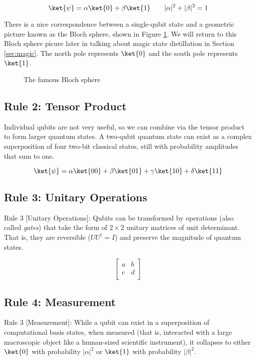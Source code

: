 \begin{equation}
\ket{\psi} = \alpha \ket{0} + \beta \ket{1} \qquad
|\alpha|^2 + |\beta|^2 = 1
\end{equation}

There is a nice correspondence between a single-qubit state and a geometric
picture known as the Bloch sphere, shown in Figure \ref{fig:bloch-sphere}.
We will return to this Bloch sphere picure later in talking about
magic state distillation in Section \ref{sec:magic}.
The north pole represents $\ket{0}$ and the south pole represents $\ket{1}$.

\begin{figure}
\label{fig:bloch-sphere}
\caption{The famous Bloch sphere}
\end{figure}

\subsection{Rule 2: Tensor Product}

Individual qubits are not very useful, so we
can combine via the tensor product to form larger quantum
states. A two-qubit quantum state can exist as a complex superposition of
four two-bit classical states, still with probability amplitudes that sum to
one.

\begin{equation}
\ket{\psi} = \alpha \ket{00} + \beta \ket{01} + \gamma \ket{10} + \delta \ket{11}
\end{equation}

\subsection{Rule 3: Unitary Operations}

Rule 3 [Unitary Operations]:
Qubits can be transformed by operations (also called \emph{gates})
that take the form of $2\times 2$ unitary matrices of unit determinant.
That is, they are reversible ($UU^\dagger = I$) and preserve the magnitude
of quantum states.

\begin{equation}
\left[ \begin{array}{cc}
a & b \\
c & d \\
\end{array} \right]
\end{equation}

\subsection{Rule 4: Measurement}

Rule 3 [Measurement]: While a qubit can exist in a superposition
of computational basis states, when measured (that is, interacted with a
large macroscopic object like a human-sized scientific instrument), it
collapses to either $\ket{0}$ with probability $|\alpha|^2$ or
$\ket{1}$ with probability $|\beta|^2$.

